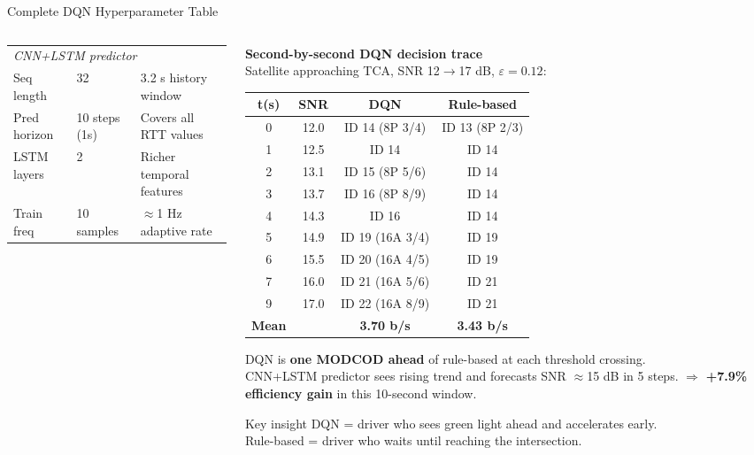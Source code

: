 \documentclass[aspectratio=169,10pt]{beamer}
\begin{document}
\begin{frame}[shrink=12]{Complete DQN Hyperparameter Table}
\begin{columns}[T]
\begin{column}{0.50\textwidth}
{\begin{tabular}{p{3.0cm}p{1.5cm}p{3.2cm}}
        \midrule
        \multicolumn{3}{l}{\textit{CNN+LSTM predictor}}\\
        Seq length     & 32            & 3.2 s history window\\
        Pred horizon   & 10 steps (1s) & Covers all RTT values\\
        LSTM layers    & 2             & Richer temporal features\\
        Train freq     & 10 samples    & $\approx$1 Hz adaptive rate\\
        \bottomrule
      \end{tabular}}
    \end{column}
    \begin{column}{0.46\textwidth}
      \textbf{Second-by-second DQN decision trace}\\
      \scriptsize Satellite approaching TCA, SNR 12$\to$17 dB, $\varepsilon=0.12$:

      {\scriptsize
      \begin{tabular}{cccc}
        \toprule
        \textbf{t(s)} & \textbf{SNR} & \textbf{DQN} & \textbf{Rule-based}\\
        \midrule
        0 & 12.0 & ID 14 (8P 3/4) & ID 13 (8P 2/3)\\
        1 & 12.5 & ID 14          & ID 14\\
        2 & 13.1 & \alert{ID 15 (8P 5/6)} & ID 14\\
        3 & 13.7 & \alert{ID 16 (8P 8/9)} & ID 14\\
        4 & 14.3 & ID 16          & ID 14\\
        5 & 14.9 & ID 19 (16A 3/4)& ID 19\\
        6 & 15.5 & \alert{ID 20 (16A 4/5)}& ID 19\\
        7 & 16.0 & ID 21 (16A 5/6)& ID 21\\
        9 & 17.0 & \alert{ID 22 (16A 8/9)}& ID 21\\
        \midrule
        \textbf{Mean} & & \textbf{3.70 b/s} & \textbf{3.43 b/s}\\
        \bottomrule
      \end{tabular}}

      \vspace{0.3em}
      DQN is \textbf{one MODCOD ahead} of rule-based at each threshold crossing.\\
      CNN+LSTM predictor sees rising trend and forecasts SNR $\approx$15 dB in 5 steps.
      $\Rightarrow$ \textbf{+7.9\% efficiency gain} in this 10-second window.

      \vspace{0.3em}
      \begin{keybox}{Key insight}
        \scriptsize DQN = driver who sees green light ahead and accelerates early.\\
        Rule-based = driver who waits until reaching the intersection.
      \end{keybox}
    \end{column}
  \end{columns}
\end{frame}
\end{document}
